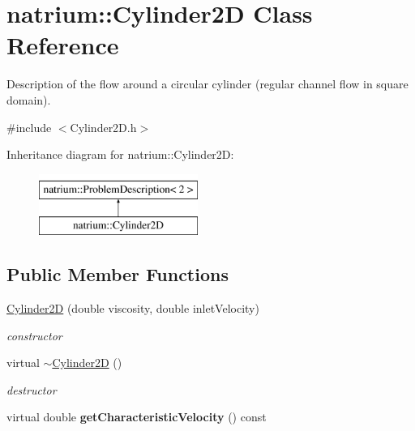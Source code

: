 \hypertarget{classnatrium_1_1Cylinder2D}{\section{natrium\-:\-:Cylinder2\-D Class Reference}
\label{classnatrium_1_1Cylinder2D}
}


Description of the flow around a circular cylinder (regular channel flow in square domain).  




{\ttfamily \#include $<$Cylinder2\-D.\-h$>$}

Inheritance diagram for natrium\-:\-:Cylinder2\-D\-:\begin{figure}[H]
\begin{center}
\leavevmode
\includegraphics[height=2.000000cm]{classnatrium_1_1Cylinder2D}
\end{center}
\end{figure}
\subsection*{Public Member Functions}
\begin{DoxyCompactItemize}
\item 
\hyperlink{classnatrium_1_1Cylinder2D_a38e5826b6fd4fc859b74783de3999658}{Cylinder2\-D} (double viscosity, double inlet\-Velocity)
\begin{DoxyCompactList}\small\item\em constructor \end{DoxyCompactList}\item 
\hypertarget{classnatrium_1_1Cylinder2D_a40a33168f7deb7f35e4eb7b3f749b4a3}{virtual \hyperlink{classnatrium_1_1Cylinder2D_a40a33168f7deb7f35e4eb7b3f749b4a3}{$\sim$\-Cylinder2\-D} ()}\label{classnatrium_1_1Cylinder2D_a40a33168f7deb7f35e4eb7b3f749b4a3}

\begin{DoxyCompactList}\small\item\em destructor \end{DoxyCompactList}\item 
\hypertarget{classnatrium_1_1Cylinder2D_a6e32e2b875af680163160779aca52134}{virtual double {\bfseries get\-Characteristic\-Velocity} () const }\label{classnatrium_1_1Cylinder2D_a6e32e2b875af680163160779aca52134}

\end{DoxyCompactItemize}


